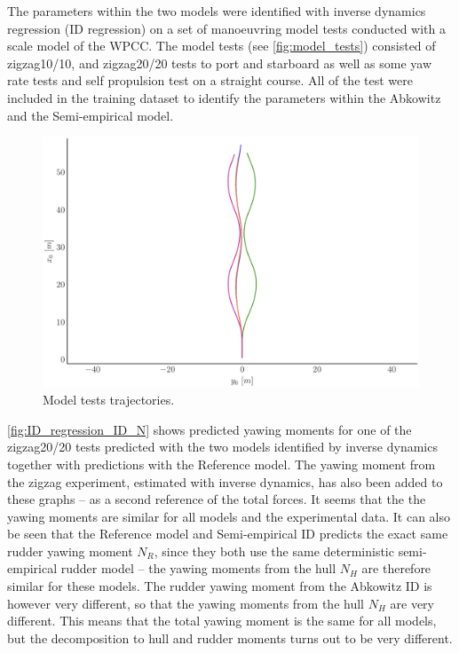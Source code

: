 The parameters within the two models were identified with inverse dynamics regression (ID regression) on a set of manoeuvring model tests conducted with a scale model of the WPCC. The model tests (see \autoref{fig:model_tests}) consisted of zigzag10/10, and zigzag20/20 tests to port and starboard as well as some yaw rate tests and self propulsion test on a straight course. All of the test were included in the training dataset to identify the parameters within the Abkowitz and the Semi-empirical model.
\begin{figure}[h]
    \includegraphics[width=\columnwidth]{figures/result_ID_regression.model_tests.pdf}
    \caption{Model tests trajectories.}
    \label{fig:model_tests}
\end{figure}
\autoref{fig:ID_regression_ID_N} shows predicted yawing moments for one of the zigzag20/20 tests predicted with the two models identified by inverse dynamics together with predictions with the Reference model. The yawing moment from the zigzag experiment, estimated with inverse dynamics, has also been added to these graphs -- as a second reference of the total forces. It seems that the the yawing moments are similar for all models and the experimental data. It can also be seen that the Reference model and Semi-empirical ID predicts the exact same rudder yawing moment $N_R$, since they both use the same deterministic semi-empirical rudder model -- the yawing moments from the hull $N_H$ are therefore similar for these models. The rudder yawing moment from the Abkowitz ID is however very different, so that the yawing moments from the hull $N_H$ are very different. This means that the total yawing moment is the same for all models, but the decomposition to hull and rudder moments turns out to be very different.

